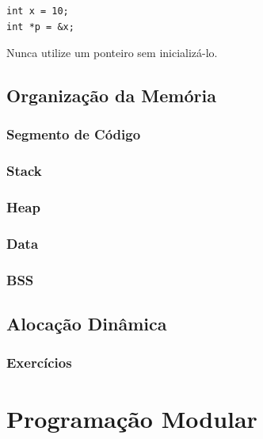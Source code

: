 \documentclass[12pt,a4paper,oneside]{extreport}
\begin{document}
\begin{lstlisting}
int x = 10;
int *p = &x;
\end{lstlisting}


\begin{tcolorbox}[title=Importante]

Nunca utilize um ponteiro sem inicializá-lo.

\end{tcolorbox}


\chapter{Organização da Memória}

\section{Segmento de Código}

\section{Stack}

\section{Heap}

\section{Data}

\section{BSS}


\chapter{Alocação Dinâmica}

\section*{Exercícios}



\part{Programação Modular}
\end{document}
